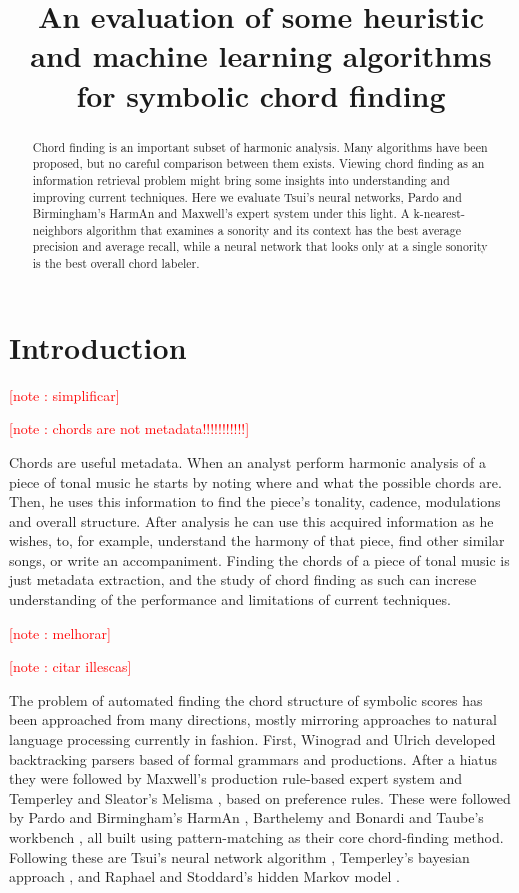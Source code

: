 \documentclass{article}
\title{An evaluation of some heuristic and machine learning algorithms for
  symbolic chord finding} \oneauthor {}{}
\newcounter{notecounter}
\newcommand{\note}[1]{
  \addtocounter{notecounter}{1}
  \textcolor{red}{[note \arabic{notecounter}: #1]}
}
\begin{document}
\graphicspath{{figs/}{data/}}
\maketitle

\begin{abstract}
  Chord finding is an important subset of harmonic analysis. Many
  algorithms have been proposed, but no careful comparison between
  them exists. Viewing chord finding as an information retrieval
  problem might bring some insights into understanding and improving
  current techniques. Here we evaluate Tsui's neural networks, Pardo
  and Birmingham's HarmAn and Maxwell's expert system under this
  light. A k-nearest-neighbors algorithm that examines a sonority and
  its context has the best average precision and average recall, while
  a neural network that looks only at a single sonority is the best
  overall chord labeler.
\end{abstract}

\section{Introduction}
\label{sec:introduction}

\note{simplificar}
\note{chords are not metadata!!!!!!!!!!!}
Chords are useful metadata. When an analyst perform harmonic analysis
of a piece of tonal music he starts by noting where and what the
possible chords are. Then, he uses this information to find the
piece's tonality, cadence, modulations and overall structure. After
analysis he can use this acquired information as he wishes, to, for
example, understand the harmony of that piece, find other similar
songs, or write an accompaniment. Finding the chords of a piece of
tonal music is just metadata extraction, and the study of chord
finding as such can increse understanding of the performance and
limitations of current techniques.

\note{melhorar}
\note{citar illescas}
The problem of automated finding the chord structure of symbolic
scores has been approached from many directions, mostly mirroring
approaches to natural language processing currently in fashion.
First, Winograd \cite{winograd:linguistics} and Ulrich
\cite{ulrich:analysis} developed backtracking parsers based of formal
grammars and productions. After a hiatus they were followed by
Maxwell's \cite{maxwell:expert} production rule-based expert system
and Temperley and Sleator's Melisma \cite{temperley.ea:modeling},
based on preference rules. These were followed by Pardo and
Birmingham's HarmAn \cite{pardo.ea:algorithms}, Barthelemy and Bonardi
\cite{barthelemy.ea:figured} and Taube's workbench
\cite{taube:automatic}, all built using pattern-matching as their core
chord-finding method. Following these are Tsui's
neural network algorithm \cite{tsui:harmonic}, Temperley's 
bayesian approach \cite{temperley:bayesian}, and Raphael and
Stoddard's hidden Markov model \cite{raphael.ea:harmonic}.
\end{document}
